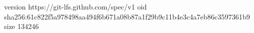 version https://git-lfs.github.com/spec/v1
oid sha256:61c822f5a978498aa494f6b671a08b87a1f29b9c11b4e3c4a7eb86c3597361b9
size 134246
